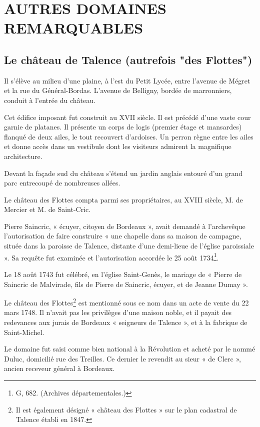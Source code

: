 \chapter{AUTRES DOMAINES REMARQUABLES}

\section{Le château de Talence (autrefois "des Flottes")}

Il s'élève au milieu d'une plaine, à l'est du Petit Lycée, entre l'avenue de Mégret et la rue du Général-Bordas. L'avenue de Belligny, bordée de marronniers, conduit à l'entrée du château.

Cet édifice imposant fut construit au XVII\ieme{} siècle. Il est précédé d'une vaste cour garnie de platanes. Il présente un corps de logis (premier étage et mansardes) flanqué de deux ailes, le tout recouvert d'ardoises. Un perron règne entre les ailes et donne accès dans un vestibule dont les visiteurs admirent la magnifique architecture.

Devant la façade sud du château s'étend un jardin anglais entouré d'un grand parc entrecoupé de nombreuses allées.

Le château des Flottes compta parmi ses propriétaires, au XVIII\ieme{} siècle, M. de Mercier et M. de Saint-Cric.

Pierre Saincric, « écuyer, citoyen de Bordeaux », avait demandé à l'archevêque l'autorisation de faire construire « une chapelle dans sa maison de campagne, située dans la paroisse de Talence, distante d'une demi-lieue de l'église paroissiale ». Sa requête fut examinée et l'autorisation accordée le 25 août 1734\footnote{G, 682. (Archives départementales.)}.

Le 18 août 1743 fut célébré, en l'église Saint-Genès, le mariage de « Pierre de Saincric de Malvirade, fils de Pierre de Saincric, écuyer, et de Jeanne Dumay ».

Le château des Flottes\footnote{Il est également désigné « château des Flottes » sur le plan cadastral de Talence établi en 1847.} est mentionné sous ce nom dans un acte de vente du 22 mars 1748. Il n'avait pas les privilèges d'une maison noble, et il payait des redevances aux jurais de Bordeaux « seigneurs de Talence », et à la fabrique de Saint-Michel.

Le domaine fut saisi comme bien national à la Révolution et acheté par le nommé Duluc, domicilié rue des Treilles. Ce dernier le revendit au sieur « de Clerc », ancien receveur général à Bordeaux.

